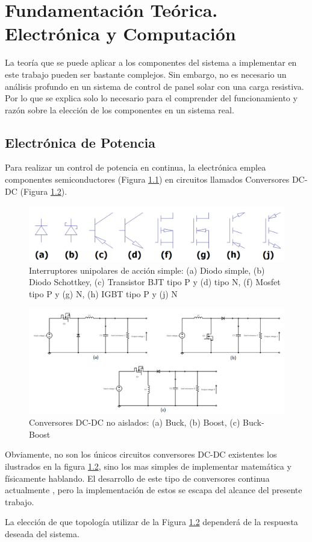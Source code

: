 \chapter{Fundamentación Teórica. Electrónica y Computación}
\label{teoria}
La teoría que se puede aplicar a los componentes del sistema a implementar en este trabajo pueden ser bastante complejos. Sin embargo, no es necesario un análisis profundo en un sistema de control de panel solar con una carga resistiva. Por lo que se explica solo lo necesario para el comprender del funcionamiento y razón sobre la elección de los componentes en un sistema real.
\section{Electrónica de Potencia}
Para realizar un control de potencia en continua, la electrónica emplea componentes semiconductores (Figura \ref{fig:semicon}) en circuitos llamados Conversores DC-DC (Figura \ref{fig:topologiassimples}).
\begin{figure}[H]
    \centering
    \includegraphics[width=\linewidth]{imagenes/semiconductores.png}
    \caption{Interruptores unipolares de acción simple: (a) Diodo simple, (b) Diodo Schottkey, (c) Transistor BJT tipo P y (d) tipo N, (f) Mosfet tipo P y (g) N, (h) IGBT tipo P y (j) N}
    \label{fig:semicon}
\end{figure}

\begin{figure}[H]
    \centering
    \includegraphics[width=\linewidth]{imagenes/simpletopologies.png}
    \caption{Conversores DC-DC no aislados: (a) Buck, (b) Boost, (c) Buck-Boost}
    \label{fig:topologiassimples}
\end{figure}
Obviamente, no son los únicos circuitos conversores DC-DC existentes los ilustrados en la figura \ref{fig:topologiassimples}, sino los mas simples de implementar matemática y físicamente hablando. El desarrollo de este tipo de conversores continua actualmente \cite{power}, pero la implementación de estos se escapa del alcance del presente trabajo.\par La elección de que topología utilizar de la Figura \ref{fig:topologiassimples} dependerá de la respuesta deseada del sistema.
